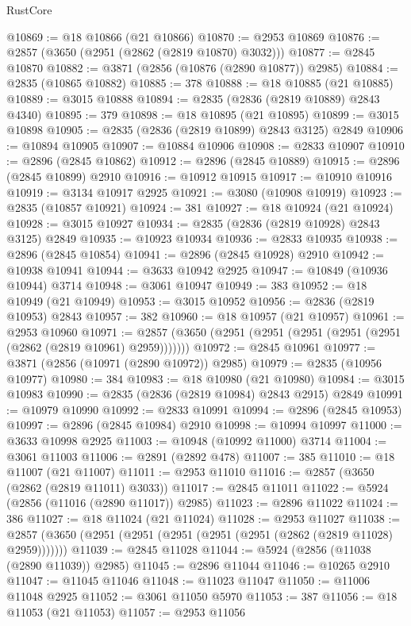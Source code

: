 \begin{lexlean}{RustCore}
\begin{coremodule}
@10869 := @18 @10866 (@21 @10866)
@10870 := @2953 @10869
@10876 := @2857 (@3650 (@2951 (@2862 (@2819 @10870) @3032)))
@10877 := @2845 @10870
@10882 := @3871 (@2856 (@10876 (@2890 @10877)) @2985)
@10884 := @2835 (@10865 @10882)
@10885 := 378
@10888 := @18 @10885 (@21 @10885)
@10889 := @3015 @10888
@10894 := @2835 (@2836 (@2819 @10889) @2843 @4340)
@10895 := 379
@10898 := @18 @10895 (@21 @10895)
@10899 := @3015 @10898
@10905 := @2835 (@2836 (@2819 @10899) @2843 @3125) @2849
@10906 := @10894 @10905
@10907 := @10884 @10906
@10908 := @2833 @10907
@10910 := @2896 (@2845 @10862)
@10912 := @2896 (@2845 @10889)
@10915 := @2896 (@2845 @10899) @2910
@10916 := @10912 @10915
@10917 := @10910 @10916
@10919 := @3134 @10917 @2925
@10921 := @3080 (@10908 @10919)
@10923 := @2835 (@10857 @10921)
@10924 := 381
@10927 := @18 @10924 (@21 @10924)
@10928 := @3015 @10927
@10934 := @2835 (@2836 (@2819 @10928) @2843 @3125) @2849
@10935 := @10923 @10934
@10936 := @2833 @10935
@10938 := @2896 (@2845 @10854)
@10941 := @2896 (@2845 @10928) @2910
@10942 := @10938 @10941
@10944 := @3633 @10942 @2925
@10947 := @10849 (@10936 @10944) @3714
@10948 := @3061 @10947
@10949 := 383
@10952 := @18 @10949 (@21 @10949)
@10953 := @3015 @10952
@10956 := @2836 (@2819 @10953) @2843
@10957 := 382
@10960 := @18 @10957 (@21 @10957)
@10961 := @2953 @10960
@10971 := @2857 (@3650 (@2951 (@2951 (@2951 (@2951 (@2951 (@2862 (@2819 @10961) @2959)))))))
@10972 := @2845 @10961
@10977 := @3871 (@2856 (@10971 (@2890 @10972)) @2985)
@10979 := @2835 (@10956 @10977)
@10980 := 384
@10983 := @18 @10980 (@21 @10980)
@10984 := @3015 @10983
@10990 := @2835 (@2836 (@2819 @10984) @2843 @2915) @2849
@10991 := @10979 @10990
@10992 := @2833 @10991
@10994 := @2896 (@2845 @10953)
@10997 := @2896 (@2845 @10984) @2910
@10998 := @10994 @10997
@11000 := @3633 @10998 @2925
@11003 := @10948 (@10992 @11000) @3714
@11004 := @3061 @11003
@11006 := @2891 (@2892 @478)
@11007 := 385
@11010 := @18 @11007 (@21 @11007)
@11011 := @2953 @11010
@11016 := @2857 (@3650 (@2862 (@2819 @11011) @3033))
@11017 := @2845 @11011
@11022 := @5924 (@2856 (@11016 (@2890 @11017)) @2985)
@11023 := @2896 @11022
@11024 := 386
@11027 := @18 @11024 (@21 @11024)
@11028 := @2953 @11027
@11038 := @2857 (@3650 (@2951 (@2951 (@2951 (@2951 (@2951 (@2862 (@2819 @11028) @2959)))))))
@11039 := @2845 @11028
@11044 := @5924 (@2856 (@11038 (@2890 @11039)) @2985)
@11045 := @2896 @11044
@11046 := @10265 @2910
@11047 := @11045 @11046
@11048 := @11023 @11047
@11050 := @11006 @11048 @2925
@11052 := @3061 @11050 @5970
@11053 := 387
@11056 := @18 @11053 (@21 @11053)
@11057 := @2953 @11056

\end{coremodule}
\end{lexlean}
